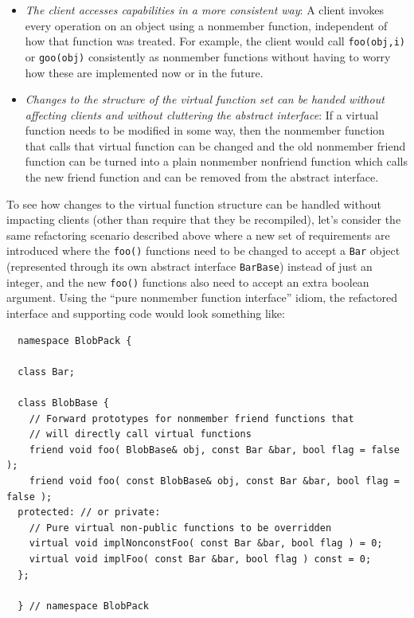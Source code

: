 \documentclass[pdf,ps2pdf,11pt]{SANDreport}
\begin{document}
\begin{itemize}

{}\item\textit{The client accesses capabilities in a more consistent way}: A
client invokes every operation on an object using a nonmember function,
independent of how that function was treated.  For example, the client would
call {}\texttt{foo(obj,i)} or {}\texttt{goo(obj)} consistently as nonmember
functions without having to worry how these are implemented now or in the
future.

{}\item\textit{Changes to the structure of the virtual function set can be
handed without affecting clients and without cluttering the abstract
interface}: If a virtual function needs to be modified in some way, then the
nonmember function that calls that virtual function can be changed and the old
nonmember friend function can be turned into a plain nonmember nonfriend
function which calls the new friend function and can be removed from the
abstract interface.

\end{itemize}

To see how changes to the virtual function structure can be handled without
impacting clients (other than require that they be recompiled), let's consider
the same refactoring scenario described above where a new set of requirements
are introduced where the {}\texttt{foo()} functions need to be changed to
accept a {}\texttt{Bar} object (represented through its own abstract interface
{}\texttt{Bar\-Base}) instead of just an integer, and the new {}\texttt{foo()}
functions also need to accept an extra boolean argument.  Using the ``pure
nonmember function interface'' idiom, the refactored interface and supporting
code would look something like:

{\small\begin{verbatim}
  namespace BlobPack {

  class Bar;

  class BlobBase {
    // Forward prototypes for nonmember friend functions that
    // will directly call virtual functions
    friend void foo( BlobBase& obj, const Bar &bar, bool flag = false );
    friend void foo( const BlobBase& obj, const Bar &bar, bool flag = false );
  protected: // or private:
    // Pure virtual non-public functions to be overridden
    virtual void implNonconstFoo( const Bar &bar, bool flag ) = 0;
    virtual void implFoo( const Bar &bar, bool flag ) const = 0;
  };

  } // namespace BlobPack
\end{verbatim}}
\end{document}
